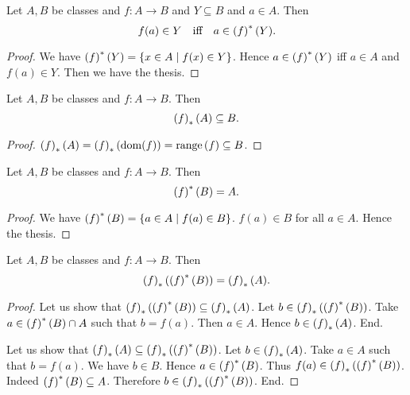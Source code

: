 \documentclass[../../set-theory/set-theory.tex]{subfiles}
\begin{document}
  \begin{forthel}
    \begin{proposition}
      Let $A, B$ be classes and $f : A \to B$ and $Y \subseteq B$ and $a \in A$.
      Then \[ f(a) \in Y \quad \text{iff} \quad a \in \left(f\right)^{*}(Y). \]
    \end{proposition}
    \begin{proof}
      We have $\left(f\right)^{*}(Y) = \{ x \in A \mid f(x) \in Y \}$.
      Hence $a \in \left(f\right)^{*}(Y)$ iff $a \in A$ and $f(a) \in Y$.
      Then we have the thesis.
    \end{proof}
  \end{forthel}

  \begin{forthel}
    \begin{proposition}
      Let $A, B$ be classes and $f : A \to B$.
      Then \[ \left(f\right)_{*}(A) \subseteq B. \]
    \end{proposition}
    \begin{proof}
      $\left(f\right)_{*}(A) = \left(f\right)_{*}(\operatorname{dom}(f)) = \mathrm{range}\left(f\right) \subseteq B$.
    \end{proof}
  \end{forthel}

  \begin{forthel}
    \begin{proposition}
      Let $A, B$ be classes and $f : A \to B$.
      Then \[ \left(f\right)^{*}(B) = A. \]
    \end{proposition}
    \begin{proof}
      We have $\left(f\right)^{*}(B) = \{ a \in A \mid f(a) \in B \}$.
      $f(a) \in B$ for all $a \in A$.
      Hence the thesis.
    \end{proof}
  \end{forthel}

  \begin{forthel}
    \begin{proposition}
      Let $A, B$ be classes and $f : A \to B$.
      Then \[ \left(f\right)_{*}(\left(f\right)^{*}(B)) = \left(f\right)_{*}(A). \]
    \end{proposition}
    \begin{proof}
      Let us show that $\left(f\right)_{*}(\left(f\right)^{*}(B)) \subseteq \left(f\right)_{*}(A)$.
        Let $b \in \left(f\right)_{*}(\left(f\right)^{*}(B))$.
        Take $a \in \left(f\right)^{*}(B) \cap A$ such that $b = f(a)$.
        Then $a \in A$.
        Hence $b \in \left(f\right)_{*}(A)$.
      End.

      Let us show that $\left(f\right)_{*}(A) \subseteq \left(f\right)_{*}(\left(f\right)^{*}(B))$.
        Let $b \in \left(f\right)_{*}(A)$.
        Take $a \in A$ such that $b = f(a)$.
        We have $b \in B$.
        Hence $a \in \left(f\right)^{*}(B)$.
        Thus $f(a) \in \left(f\right)_{*}(\left(f\right)^{*}(B))$.
        Indeed $\left(f\right)^{*}(B) \subseteq A$.
        Therefore $b \in \left(f\right)_{*}(\left(f\right)^{*}(B))$.
      End.
    \end{proof}
  \end{forthel}
\end{document}
